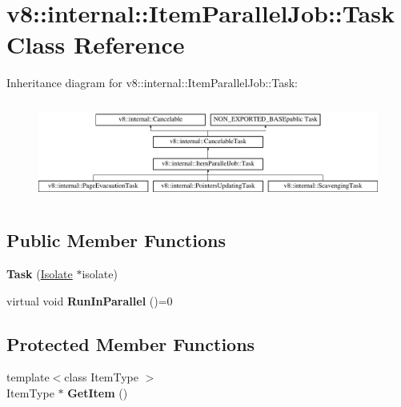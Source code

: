 \hypertarget{classv8_1_1internal_1_1ItemParallelJob_1_1Task}{}\section{v8\+:\+:internal\+:\+:Item\+Parallel\+Job\+:\+:Task Class Reference}
\label{classv8_1_1internal_1_1ItemParallelJob_1_1Task}
Inheritance diagram for v8\+:\+:internal\+:\+:Item\+Parallel\+Job\+:\+:Task\+:\begin{figure}[H]
\begin{center}
\leavevmode
\includegraphics[height=3.289281cm]{classv8_1_1internal_1_1ItemParallelJob_1_1Task}
\end{center}
\end{figure}
\subsection*{Public Member Functions}
\begin{DoxyCompactItemize}
\item 
\mbox{\label{classv8_1_1internal_1_1ItemParallelJob_1_1Task_aa78b519ed9128ad36419e25384fc4afb}} 
{\bfseries Task} (\mbox{\hyperlink{classv8_1_1internal_1_1Isolate}{Isolate}} $\ast$isolate)
\item 
\mbox{\label{classv8_1_1internal_1_1ItemParallelJob_1_1Task_a7258d2c24f7f1e7846573c8f1f895477}} 
virtual void {\bfseries Run\+In\+Parallel} ()=0
\end{DoxyCompactItemize}
\subsection*{Protected Member Functions}
\begin{DoxyCompactItemize}
\item 
\mbox{\label{classv8_1_1internal_1_1ItemParallelJob_1_1Task_a8d940647e069f8617f382ac0b3b83891}} 
{\footnotesize template$<$class Item\+Type $>$ }\\Item\+Type $\ast$ {\bfseries Get\+Item} ()
\end{DoxyCompactItemize}
